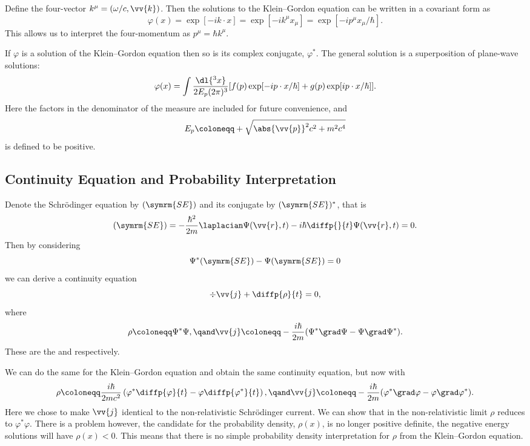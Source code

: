Define the four-vector \(k^\mu = (\omega/c, \vv{k})\).
Then the solutions to the Klein--Gordon equation can be written in a covariant form as
\begin{equation}
    \varphi(x) = \exp[-ik \cdot x] = \exp[-ik^\mu x_\mu] = \exp[-ip^\mu x_\mu/\hbar].
\end{equation}
This allows us to interpret the four-momentum as \(p^\mu = \hbar k^\mu\).

If \(\varphi\) is a solution of the Klein--Gordon equation then so is its complex conjugate, \(\varphi^*\).
The general solution is a superposition of plane-wave solutions:
\begin{equation}
    \varphi(x) = \int \frac{\dl{^3x}}{2E_p(2\pi)^3}[f(p)\exp[-ip\cdot x/\hbar] + g(p) \exp[ip\cdot x/\hbar]].
\end{equation}
Here the factors in the denominator of the measure are included for future convenience, and
\begin{equation}
    E_p \coloneqq +\sqrt{\abs{\vv{p}}^2c^2 + m^2c^4}
\end{equation}
is defined to be positive.

\subsection{Continuity Equation and Probability Interpretation}
Denote the Schrödinger equation by \((\symrm{SE})\) and its conjugate by \((\symrm{SE})^*\), that is
\begin{equation}
    (\symrm{SE}) = -\frac{\hbar^2}{2m} \laplacian \Psi(\vv{r}, t) - i\hbar\diffp{}{t}\Psi(\vv{r}, t) = 0.
\end{equation}
Then by considering
\begin{equation}
    \Psi^*(\symrm{SE}) - \Psi(\symrm{SE}) = 0
\end{equation}
we can derive a continuity equation
\begin{equation}
    \div\vv{j} + \diffp{\rho}{t} = 0,
\end{equation}
where
\begin{equation}
    \rho \coloneqq \Psi^*\Psi, \qand \vv{j} \coloneqq -\frac{i\hbar}{2m} (\Psi^*\grad \Psi - \Psi \grad \Psi^*).
\end{equation}
These are the  and  respectively.

We can do the same for the Klein--Gordon equation and obtain the same continuity equation, but now with
\begin{equation}
    \rho \coloneqq \frac{i\hbar}{2mc^2} \left( \varphi^* \diffp{\varphi}{t} - \varphi \diffp{\varphi^*}{t} \right), \qand \vv{j} \coloneqq -\frac{i\hbar}{2m}(\varphi^*\grad \varphi - \varphi\grad\varphi^*).
\end{equation}
Here we chose to make \(\vv{j}\) identical to the non-relativistic Schrödinger current.
We can show that in the non-relativistic limit \(\rho\) reduces to \(\varphi^*\varphi\).
There is a problem however, the candidate for the probability density, \(\rho(x)\), is no longer positive definite, the negative energy solutions will have \(\rho(x) < 0\).
This means that there is no simple probability density interpretation for \(\rho\) from the Klein--Gordon equation.

